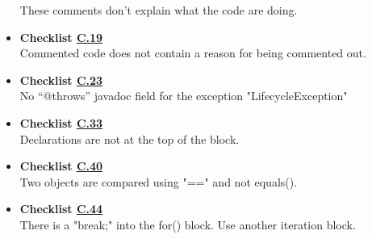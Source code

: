 \documentclass[../../../../codeInspection.tex]{subfiles}
\begin{document}
\begin{itemize}
		    	  These comments don't explain what the code are doing.

		    \item \textbf{Checklist \hyperref[C:19]{C.19}} \\

		    	  

		    	  

		    	  

		    	  Commented code does not contain a reason for being commented out.

		    \item \textbf{Checklist \hyperref[C:23]{C.23}} \\

		          

		          No “@throws” javadoc field for the exception "LifecycleException"

		    \item \textbf{Checklist \hyperref[C:33]{C.33}} \\

		    	  

		    	  Declarations are not at the top of the block.

		    \item \textbf{Checklist \hyperref[C:40]{C.40}} \\

		          

		          Two objects are compared using "==" and not equals().

		    \item \textbf{Checklist \hyperref[C:44]{C.44}} \\

		          

		          There is a "break;" into the for() block. Use another iteration block.


\end{itemize}
\end{document}
